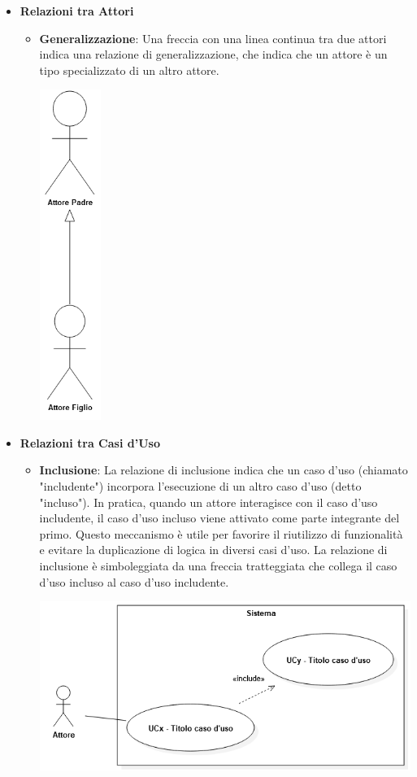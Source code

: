\begin{itemize}
\begin{itemize}
\begin{center}
		\end{center}
	\end{itemize} \newpage
	\item \textbf{Relazioni tra Attori}
	\begin{itemize}
		\item \textbf{Generalizzazione}: Una freccia con una linea continua tra due attori indica una relazione di generalizzazione, che indica che un attore è un tipo specializzato di un altro attore.
		\begin{center}
			\includegraphics*[width=2cm]{../../../images/norme_di_progetto/generalizzazioneTraAttori.png}
		\end{center}
	\end{itemize} \newpage
	\item \textbf{Relazioni tra Casi d'Uso}
	\begin{itemize}
		\item \textbf{Inclusione}: La relazione di inclusione indica che un caso d'uso (chiamato "includente") incorpora l'esecuzione di un altro caso d'uso (detto "incluso"). In pratica, quando un attore interagisce con il caso d'uso includente, il caso d'uso incluso viene attivato come parte integrante del primo. Questo meccanismo è utile per favorire il riutilizzo di funzionalità e evitare la duplicazione di logica in diversi casi d'uso. La relazione di inclusione è simboleggiata da una freccia tratteggiata che collega il caso d'uso incluso al caso d'uso includente.
		\begin{center}
			\includegraphics*[width=15cm]{../../../images/norme_di_progetto/inclusione.png}

\end{center}
\end{itemize}
\end{itemize}
